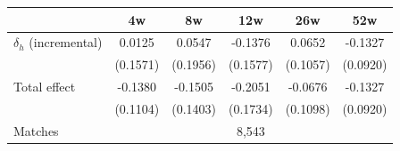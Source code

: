 \begin{tabular}{l*{5}{c}}
\toprule
 & 4w & 8w & 12w & 26w & 52w \\
\midrule
$\delta_h$ (incremental) & 0.0125 & 0.0547 & -0.1376 & 0.0652 & -0.1327 \\
 & (0.1571) & (0.1956) & (0.1577) & (0.1057) & (0.0920) \\[0.3em]
Total effect & -0.1380 & -0.1505 & -0.2051 & -0.0676 & -0.1327 \\
 & (0.1104) & (0.1403) & (0.1734) & (0.1098) & (0.0920) \\
\midrule
Matches & \multicolumn{5}{c}{8,543} \\
\bottomrule
\end{tabular}
